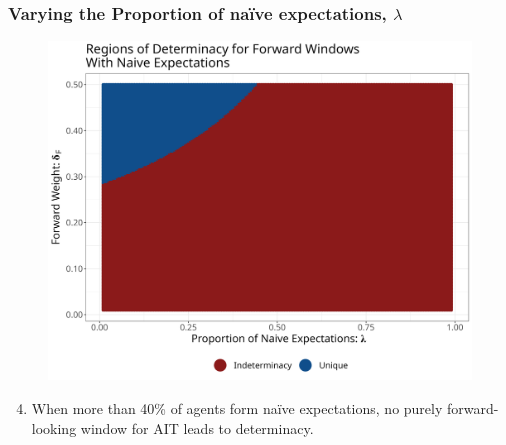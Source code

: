 \documentclass{beamer}
\begin{document}
\begin{frame}
	\frametitle{Varying the Proportion of na\"ive expectations, $\lambda$}	
	\begin{center}		
		\begin{figure}%
			\includegraphics[width=\textwidth,height=0.6\textheight,keepaspectratio]{../code/lambda_deltaF.png}
		\end{figure}%
	\end{center}%
	\begin{enumerate}
		\setcounter{enumi}{3}
		\setlength{\itemsep}{1em}
		\item When more than 40\% of agents form na\"ive expectations, no purely forward-looking window for AIT leads to determinacy.
	\end{enumerate}
\end{frame}
\end{document}

